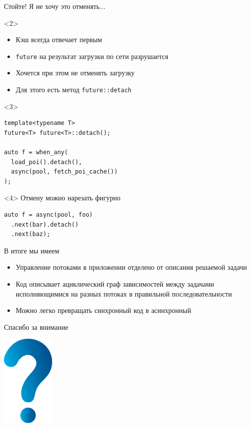 \documentclass[aspectratio=169,pdf,hyperref={unicode},17pt]{beamer}
\begin{document}
\begin{frame}[fragile,t]{Стойте! Я не хочу это отменять...}
\begin{onlyenv}<2>
\begin{itemize}
 \item Кэш всегда отвечает первым
 \item \texttt{future} на результат загрузки по сети разрушается
 \item Хочется при этом не отменять загрузку
 \item Для этого есть метод \texttt{future::detach}
\end{itemize}
\end{onlyenv}
\begin{onlyenv}<3>
\begin{lstlisting}[style=cppcode]
template<typename T>
future<T> future<T>::detach();

auto f = when_any(
  load_poi().detach(),
  async(pool, fetch_poi_cache())
);
\end{lstlisting}
\end{onlyenv}
\begin{onlyenv}<4>
Отмену можно нарезать фигурно
\begin{lstlisting}[style=cppcode]
auto f = async(pool, foo)
  .next(bar).detach()
  .next(baz);
\end{lstlisting}
\end{onlyenv}
\end{frame}

\begin{frame}[fragile,t]{В итоге мы имеем}
\begin{itemize}[<+->]
 \item Управление потоками в приложении отделено от описания решаемой задачи
 \item Код описывает ациклический граф зависимостей между задачами исполняющимися на разных потоках в правильной последовательности
 \item Можно легко превращать синхронный код в асинхронный
\end{itemize}
\end{frame}

\begin{frame}{Спасибо за внимание}
\centerline{\includegraphics[height=4.5cm]{question_mark_blue.png}}
\end{frame}
\end{document}
